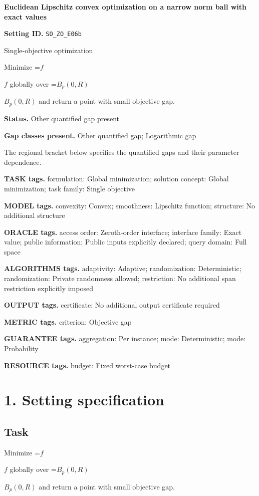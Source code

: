 \documentclass[10pt,a4paper]{article}
\newcommand{\AtlasMath}[1]{\par\begingroup\centering\setbox0=\hbox{$\displaystyle #1$}\ifdim\wd0>1.4\linewidth\typeout{ATLAS WIDE FORMULA: \the\wd0}\fi\ifdim\wd0>\linewidth\resizebox{\linewidth}{!}{\box0}\else\box0\fi\par\endgroup}
\newcommand{\AtlasInlineMath}[1]{\begingroup\setbox0=\hbox{$#1$}\ifdim\wd0>.4\linewidth\endgroup\AtlasMath{#1}\else\endgroup$#1$\fi}
\begin{document}
\raggedright

{\LARGE\bfseries\sffamily\color{AtlasNavy} Euclidean Lipschitz convex optimization on a narrow norm ball with exact values\par}\vspace{5pt}
\textbf{Setting ID.} \texttt{SO\_\allowbreak{}ZO\_\allowbreak{}E06b}

Single-objective optimization

Minimize \AtlasInlineMath{f} globally over \AtlasInlineMath{B_p(0,R)} and return a point with small objective gap.

\textbf{Status.} Other quantified gap present

\textbf{Gap classes present.} Other quantified gap; Logarithmic gap

The regional bracket below specifies the quantified gaps and their parameter dependence.

\textbf{TASK tags.} formulation: Global minimization; solution concept: Global minimization; task family: Single objective

\textbf{MODEL tags.} convexity: Convex; smoothness: Lipschitz function; structure: No additional structure

\textbf{ORACLE tags.} access order: Zeroth-order interface; interface family: Exact value; public information: Public inputs explicitly declared; query domain: Full space

\textbf{ALGORITHMS tags.} adaptivity: Adaptive; randomization: Deterministic; randomization: Private randomness allowed; restriction: No additional span restriction explicitly imposed

\textbf{OUTPUT tags.} certificate: No additional output certificate required

\textbf{METRIC tags.} criterion: Objective gap

\textbf{GUARANTEE tags.} aggregation: Per instance; mode: Deterministic; mode: Probability

\textbf{RESOURCE tags.} budget: Fixed worst-case budget

\section{1. Setting specification}
\subsection{Task}
Minimize \AtlasInlineMath{f} globally over \AtlasInlineMath{B_p(0,R)} and return a point with small objective gap.
\end{document}
